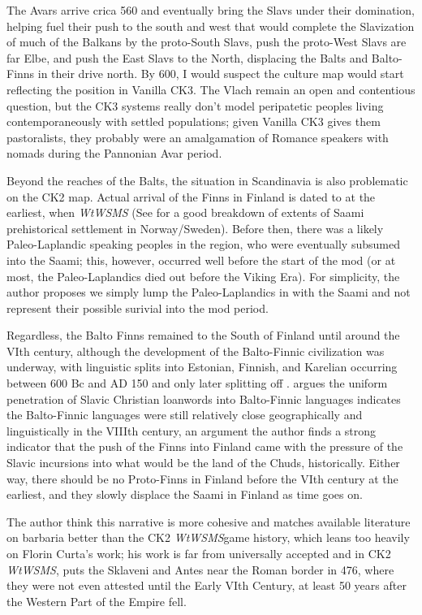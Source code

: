 \documentclass{article}
\newcommand{\wtwsms}{\textit{WtWSMS}}
\begin{document}
	The Avars arrive crica 560 and eventually bring the Slavs under their domination, helping fuel their push to the south and west that would complete the Slavization of much of the Balkans by the proto-South Slavs, push the proto-West Slavs are far Elbe, and push the East Slavs to the North, displacing the Balts and Balto-Finns in their drive north.
	By 600, I would suspect the culture map would start reflecting the position in Vanilla CK3.
	The Vlach remain an open and contentious question, but the CK3 systems really don't model peripatetic peoples living contemporaneously with settled populations; given Vanilla CK3 gives them pastoralists, they probably were an amalgamation of Romance speakers with nomads during the Pannonian Avar period.
	
	Beyond the reaches of the Balts, the situation in Scandinavia is also problematic on the CK2 map. Actual arrival of the Finns in Finland is dated to at the earliest, when \wtwsms \cite{LaplandSaami} (See \cite{SaamiMap} for a good breakdown of extents of Saami prehistorical settlement in Norway/Sweden).
	Before then, there was a likely Paleo-Laplandic speaking peoples in the region, who were eventually subsumed into the Saami; this, however, occurred well before the start of the mod (or at most, the Paleo-Laplandics died out before the Viking Era). 
	For simplicity, the author proposes we simply lump the Paleo-Laplandics in with the Saami and not represent their possible surivial into the mod period.
	
	Regardless, the Balto Finns remained to the South of Finland until around the VIth century, although the development of the Balto-Finnic civilization was underway, with linguistic splits into Estonian, Finnish, and Karelian occurring between 600 Bc and AD 150 and only later splitting off \cite{LaplandSaami,DiversificationOfProtoFinnic}.
	\cite{DiversificationOfProtoFinnic} argues the uniform penetration of Slavic Christian loanwords into Balto-Finnic languages indicates the Balto-Finnic languages were still relatively close geographically and linguistically in the VIIIth century, an argument the author finds a strong indicator that the push of the Finns into Finland came with the pressure of the Slavic incursions into what would be the land of the Chuds, historically.
	Either way, there should be no Proto-Finns in Finland before the VIth century at the earliest, and they slowly displace the Saami in Finland as time goes on.
	
	The author think this narrative is more cohesive and matches available literature on barbaria better than the CK2 \wtwsms game history, which leans too heavily on Florin Curta’s work; his work is far from universally accepted and in CK2 \wtwsms, puts the Sklaveni and Antes near the Roman border in 476, where they were not even attested until the Early VIth Century, at least 50 years after the Western Part of the Empire fell. 
	
\end{document}
